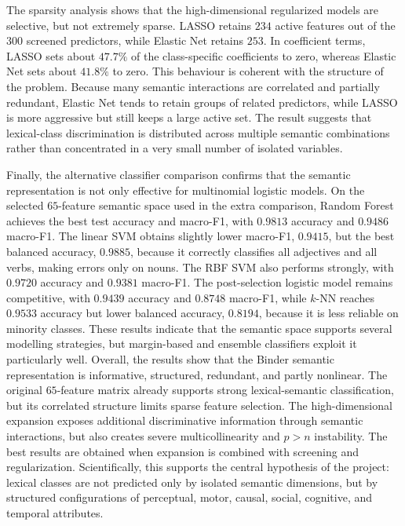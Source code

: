 \documentclass{ipgpmaster}
\begin{document}
The sparsity analysis shows that the high-dimensional regularized models are selective, but not extremely sparse. LASSO retains \(234\) active features out of the \(300\) screened predictors, while Elastic Net retains \(253\). In coefficient terms, LASSO sets about \(47.7\%\) of the class-specific coefficients to zero, whereas Elastic Net sets about \(41.8\%\) to zero. This behaviour is coherent with the structure of the problem. Because many semantic interactions are correlated and partially redundant, Elastic Net tends to retain groups of related predictors, while LASSO is more aggressive but still keeps a large active set. The result suggests that lexical-class discrimination is distributed across multiple semantic combinations rather than concentrated in a very small number of isolated variables.

Finally, the alternative classifier comparison confirms that the semantic representation is not only effective for multinomial logistic models. On the selected \(65\)-feature semantic space used in the extra comparison, Random Forest achieves the best test accuracy and macro-F1, with \(0.9813\) accuracy and \(0.9486\) macro-F1. The linear SVM obtains slightly lower macro-F1, \(0.9415\), but the best balanced accuracy, \(0.9885\), because it correctly classifies all adjectives and all verbs, making errors only on nouns. The RBF SVM also performs strongly, with \(0.9720\) accuracy and \(0.9381\) macro-F1. The post-selection logistic model remains competitive, with \(0.9439\) accuracy and \(0.8748\) macro-F1, while \(k\)-NN reaches \(0.9533\) accuracy but lower balanced accuracy, \(0.8194\), because it is less reliable on minority classes. These results indicate that the semantic space supports several modelling strategies, but margin-based and ensemble classifiers exploit it particularly well.
Overall, the results show that the Binder semantic representation is informative, structured, redundant, and partly nonlinear. The original \(65\)-feature matrix already supports strong lexical-semantic classification, but its correlated structure limits sparse feature selection. The high-dimensional expansion exposes additional discriminative information through semantic interactions, but also creates severe multicollinearity and \(p>n\) instability. The best results are obtained when expansion is combined with screening and regularization. Scientifically, this supports the central hypothesis of the project: lexical classes are not predicted only by isolated semantic dimensions, but by structured configurations of perceptual, motor, causal, social, cognitive, and temporal attributes.
\end{document}
